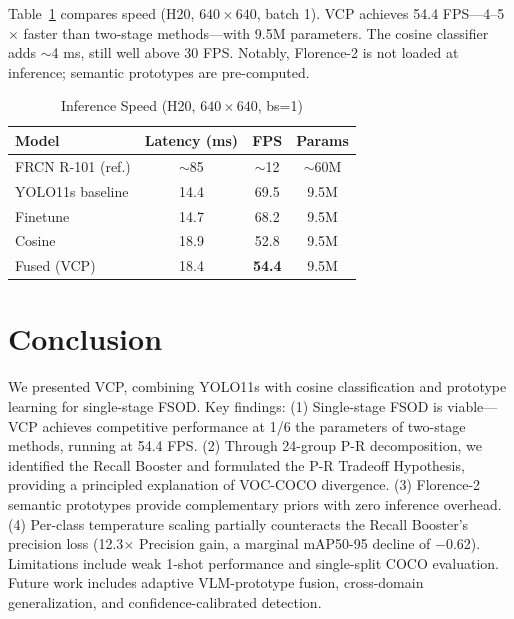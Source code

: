 \documentclass[conference]{IEEEtran}
\begin{document}
Table~\ref{tab:fps} compares speed (H20, $640\times640$, batch 1). VCP achieves 54.4 FPS---4--5$\times$ faster than two-stage methods---with 9.5M parameters. The cosine classifier adds $\sim$4 ms, still well above 30 FPS. Notably, Florence-2 is not loaded at inference; semantic prototypes are pre-computed.

\begin{table}[ht]
\centering
\caption{Inference Speed (H20, $640\times640$, bs=1)}
\label{tab:fps}
\begin{tabular}{lccc}
\toprule
Model & Latency (ms) & FPS & Params \\
\midrule
FRCN R-101 (ref.) & $\sim$85 & $\sim$12 & $\sim$60M \\
\midrule
YOLO11s baseline & 14.4 & 69.5 & 9.5M \\
Finetune          & 14.7 & 68.2 & 9.5M \\
Cosine            & 18.9 & 52.8 & 9.5M \\
Fused (VCP)       & 18.4 & \textbf{54.4} & 9.5M \\
\bottomrule
\end{tabular}
\end{table}

\section{Conclusion}

We presented VCP, combining YOLO11s with cosine classification and prototype learning for single-stage FSOD. Key findings: (1) Single-stage FSOD is viable---VCP achieves competitive performance at 1/6 the parameters of two-stage methods, running at 54.4 FPS. (2) Through 24-group P-R decomposition, we identified the Recall Booster and formulated the P-R Tradeoff Hypothesis, providing a principled explanation of VOC-COCO divergence. (3) Florence-2 semantic prototypes provide complementary priors with zero inference overhead. (4) Per-class temperature scaling partially counteracts the Recall Booster's precision loss (12.3$\times$ Precision gain, a marginal mAP50-95 decline of $-$0.62). Limitations include weak 1-shot performance and single-split COCO evaluation. Future work includes adaptive VLM-prototype fusion, cross-domain generalization, and confidence-calibrated detection.
\end{document}
